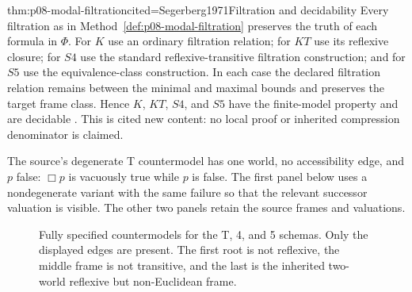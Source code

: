 \begin{hbtheorem}{thm:p08-modal-filtration}{cited=Segerberg1971}{Filtration and decidability}
Every filtration as in Method~\ref{def:p08-modal-filtration} preserves the
truth of each formula in \(\Phi\).  For \(K\) use an ordinary filtration
relation; for \(KT\) use its reflexive closure; for \(S4\) use the standard
reflexive-transitive filtration construction; and for \(S5\) use the
equivalence-class construction.
In each case the declared filtration relation remains between the minimal and maximal
bounds and preserves the target frame class.  Hence \(K\), \(KT\), \(S4\),
and \(S5\) have the
finite-model property and are decidable
\cite{BlackburnDeRijkeVenema2001,ChagrovZakharyaschev1997}.  This is cited new
content: no local proof or inherited compression denominator is claimed.
\end{hbtheorem}


The source's degenerate T countermodel has one world, no accessibility edge,
and \(p\) false: \(\Box p\) is vacuously true while \(p\) is false.  The
first panel below uses a nondegenerate variant with the same failure so that
the relevant successor valuation is visible.  The other two panels retain the
source frames and valuations.

\begin{figure}[!htbp]
\centering
{}
\caption{Fully specified countermodels for the T, 4, and 5 schemas.  Only the
displayed edges are present.  The first root is not reflexive, the middle frame
is not transitive, and the last is the inherited two-world reflexive but
non-Euclidean frame.}
\label{fig:p08-modal-countermodels}
\end{figure}

